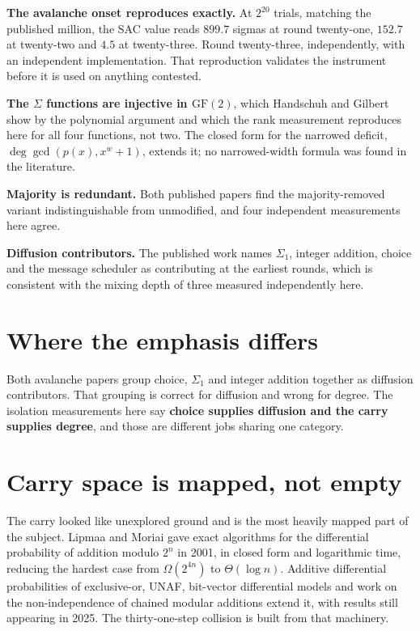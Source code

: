 \textbf{The avalanche onset reproduces exactly.} At \(2^{20}\) trials, matching the published million, the SAC value reads \(899.7\) sigmas at round twenty-one, \(152.7\) at twenty-two and \(4.5\) at twenty-three. Round twenty-three, independently, with an independent implementation. That reproduction validates the instrument before it is used on anything contested.

\textbf{The \(\Sigma\) functions are injective in \(\mathrm{GF}(2)\)}, which Handschuh and Gilbert show by the polynomial argument and which the rank measurement reproduces here for all four functions, not two. The closed form for the narrowed deficit, \(\deg \gcd(p(x), x^w+1)\), extends it; no narrowed-width formula was found in the literature.

\textbf{Majority is redundant.} Both published papers find the majority-removed variant indistinguishable from unmodified, and four independent measurements here agree.

\textbf{Diffusion contributors.} The published work names \(\Sigma_1\), integer addition, choice and the message scheduler as contributing at the earliest rounds, which is consistent with the mixing depth of three measured independently here.

\section{Where the emphasis differs}

Both avalanche papers group choice, \(\Sigma_1\) and integer addition together as diffusion contributors. That grouping is correct for diffusion and wrong for degree. The isolation measurements here say \textbf{choice supplies diffusion and the carry supplies degree}, and those are different jobs sharing one category.

\section{Carry space is mapped, not empty}

The carry looked like unexplored ground and is the most heavily mapped part of the subject. Lipmaa and Moriai gave exact algorithms for the differential probability of addition modulo \(2^n\) in 2001, in closed form and logarithmic time, reducing the hardest case from \(\Omega(2^{4n})\) to \(\Theta(\log n)\). Additive differential probabilities of exclusive-or, UNAF, bit-vector differential models and work on the non-independence of chained modular additions extend it, with results still appearing in 2025. The thirty-one-step collision is built from that machinery.


